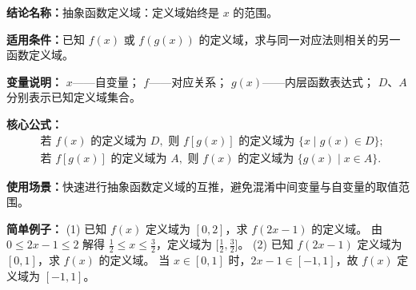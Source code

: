 \textbf{结论名称：}抽象函数定义域：定义域始终是 \(x\) 的范围。  

\textbf{适用条件：}已知 \(f(x)\) 或 \(f(g(x))\) 的定义域，求与同一对应法则相关的另一函数定义域。  

\textbf{变量说明：} \(x\)——自变量； \(f\)——对应关系； \(g(x)\)——内层函数表达式； \(D\)、\(A\) 分别表示已知定义域集合。  

\textbf{核心公式：}  
\[
\boxed{
\begin{aligned}
&\text{若 } f(x) \text{ 的定义域为 } D,\text{ 则 } f[g(x)] \text{ 的定义域为 } \{x \mid g(x) \in D\};\\
&\text{若 } f[g(x)] \text{ 的定义域为 } A,\text{ 则 } f(x) \text{ 的定义域为 } \{g(x) \mid x \in A\}.
\end{aligned}
}
\]  

\textbf{使用场景：}快速进行抽象函数定义域的互推，避免混淆中间变量与自变量的取值范围。  

\textbf{简单例子：}  
(1) 已知 \(f(x)\) 定义域为 \([0,2]\)，求 \(f(2x-1)\) 的定义域。  
由 \(0 \le 2x-1 \le 2\) 解得 \(\frac{1}{2} \le x \le \frac{3}{2}\)，定义域为 \(\big[\frac12,\frac32\big]\)。  
(2) 已知 \(f(2x-1)\) 定义域为 \([0,1]\)，求 \(f(x)\) 的定义域。  
当 \(x\in[0,1]\) 时，\(2x-1\in[-1,1]\)，故 \(f(x)\) 定义域为 \([-1,1]\)。